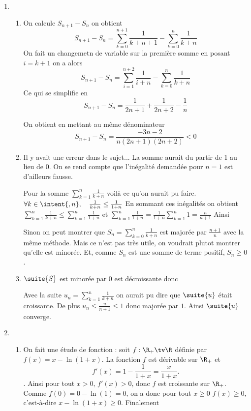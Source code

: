 \begin{correction}
\begin{enumerate}
\item 
\begin{enumerate}
\item On calcule $S_{n+1}-S_n$ on obtient 
$$S_{n+1}-S_n = \sum_{k=0}^{n+1} \frac{1}{k+n+1}- \sum_{k=0}^n \frac{1}{k+n}$$
On fait un changemetn de variable sur la première somme en posant $i=k+1$ on a alors 
$$S_{n+1} -S_n  =\sum_{i=1}^{n+2} \frac{1}{i+n}- \sum_{k=0}^n \frac{1}{k+n}$$
Ce qui se simplifie en 
$$S_{n+1} -S_n  =\frac{1}{2n+1} +\frac{1}{2n+2} - \frac{1}{n}$$

On obtient en mettant au même dénominateur 
$$S_{n+1}-S_n  =\frac{-3n-2}{n(2n+1)(2n+2)}<0$$









\item
Il y avait une erreur dans le sujet... La somme aurait du partir de 1 au lieu de $0$. On se rend compte que l'inégalité demandée pour $n=1$ est d'ailleurs fausse. 

Pour la somme $\sum_{k=1}^n\frac{1}{k+n}$ voilà ce qu'on aurait pu faire. 
$\forall k\in \intent{,n}, \quad \frac{1}{k+n}\leq \frac{1}{1+n}$
En sommant ces inégalités on obtient 
$\sum_{k=1}^n \frac{1}{k+n}\leq \sum_{k=1}^n \frac{1}{1+n}$
et $\sum_{k=1}^n \frac{1}{1+n} =\frac{1}{1+n}\sum_{k=1}^n 1 = \frac{n}{n+1}$
Ainsi

Sinon on peut montrer que $S_n = \sum_{k=0}^{n} \frac{1}{k+n}$ est majorée par $\frac{n+1}{n}$ avec la même méthode. Mais ce n'est pas très utile, on voudrait plutot montrer qu'elle est minorée.  Et, comme $S_n$ est une somme de terme positif, $S_n\geq 0$. 

\item 
$\suite{S}$ est minorée par $0$ est  décroissante donc

Avec la suite $u_n =\sum_{k=1}^n \frac{1}{k+n}$ on aurait pu dire que $\suite{u}$ était croissante. De plus $u_n\leq \frac{n}{n+1}\leq 1$ donc majorée par $1$. Ainsi $\suite{u}$ converge. 

\end{enumerate}
\item 
\begin{enumerate}


\item On fait une étude de fonction : soit $f : \R_+ \tv \R$ définie par $f(x)=x-\ln(1+x)$.  La fonction $f$ est dérivable sur $\R_+$ et $$f'(x) =1 -\frac{1}{1+x}= \frac{x}{1+x}.$$.
Ainsi pour tout $x>0$, $f'(x)>0$, donc $f$ est croissante sur $\R_+$. Comme $f(0)=0-\ln(1) =0$, on a donc pour tout $x\geq 0$
$f(x)\geq 0$, c'est-à-dire $x-\ln(1+x)\geq 0$. Finalement 
 

\end{enumerate}
\end{enumerate}
\end{correction}
